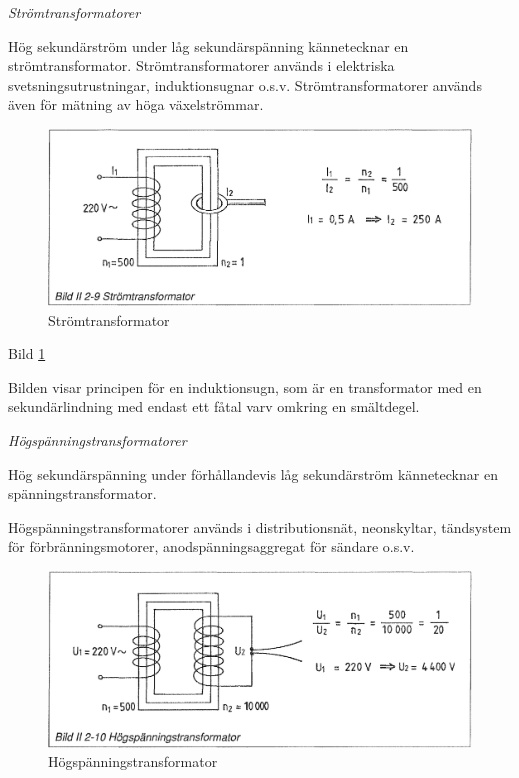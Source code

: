 \emph{Strömtransformatorer}

Hög sekundärström under låg sekundärspänning kännetecknar en strömtransformator.
Strömtransformatorer används i elektriska svetsningsutrustningar,
induktionsugnar o.s.v. Strömtransformatorer används även för mätning av höga
växelströmmar.

\begin{figure}[h]
\begin{center}
\includegraphics[width=14cm]{images/bild_2_2-09}
\caption{Strömtransformator}
\label{fig:BildII2-9}
\end{center}
\end{figure}

Bild \ref{fig:BildII2-9}

Bilden visar principen för en induktionsugn, som är en transformator med en
sekundärlindning med endast ett fåtal varv omkring en smältdegel.

\emph{Högspänningstransformatorer}

Hög sekundärspänning under förhållandevis låg sekundärström kännetecknar en
spänningstransformator.

Högspänningstransformatorer används i distributionsnät, neonskyltar, tändsystem
för förbränningsmotorer, anodspänningsaggregat för sändare o.s.v.

\begin{figure}[h]
\begin{center}
\includegraphics[width=14cm]{images/bild_2_2-10}
\caption{Högspänningstransformator}
\label{fig:BildII2-10}
\end{center}
\end{figure}

